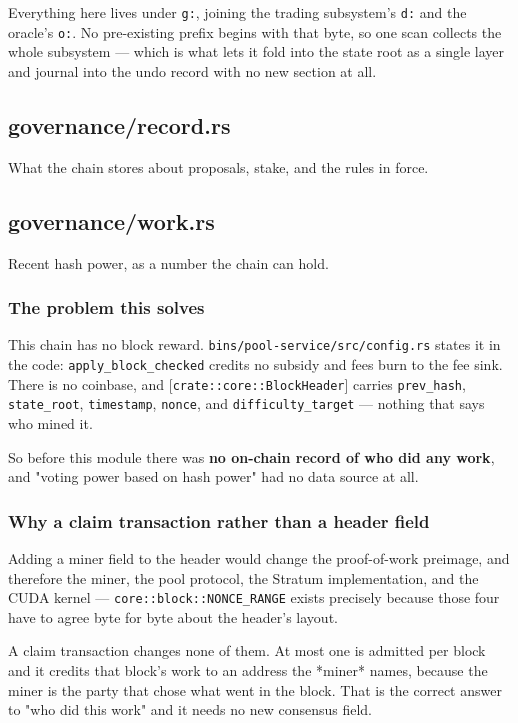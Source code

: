 \documentclass[11pt,a4paper]{article}
\begin{document}
Everything here lives under \texttt{g:}, joining the trading subsystem's \texttt{d:} and
the oracle's \texttt{o:}. No pre-existing prefix begins with that byte, so one scan
collects the whole subsystem — which is what lets it fold into the state
root as a single layer and journal into the undo record with no new section
at all.

\subsection{governance/record.rs}
What the chain stores about proposals, stake, and the rules in force.

\subsection{governance/work.rs}
Recent hash power, as a number the chain can hold.

\subsubsection{The problem this solves}

This chain has no block reward. \texttt{bins/pool-service/src/config.rs} states it in
the code: \texttt{apply\_block\_checked} credits no subsidy and fees burn to the fee
sink. There is no coinbase, and [\texttt{crate::core::BlockHeader}] carries
\texttt{prev\_hash}, \texttt{state\_root}, \texttt{timestamp}, \texttt{nonce}, and \texttt{difficulty\_target} —
nothing that says who mined it.

So before this module there was \textbf{no on-chain record of who did any work},
and "voting power based on hash power" had no data source at all.

\subsubsection{Why a claim transaction rather than a header field}

Adding a miner field to the header would change the proof-of-work preimage,
and therefore the miner, the pool protocol, the Stratum implementation, and
the CUDA kernel — \texttt{core::block::NONCE\_RANGE} exists precisely because those
four have to agree byte for byte about the header's layout.

A claim transaction changes none of them. At most one is admitted per block
and it credits that block's work to an address the *miner* names, because
the miner is the party that chose what went in the block. That is the
correct answer to "who did this work" and it needs no new consensus field.
\end{document}
